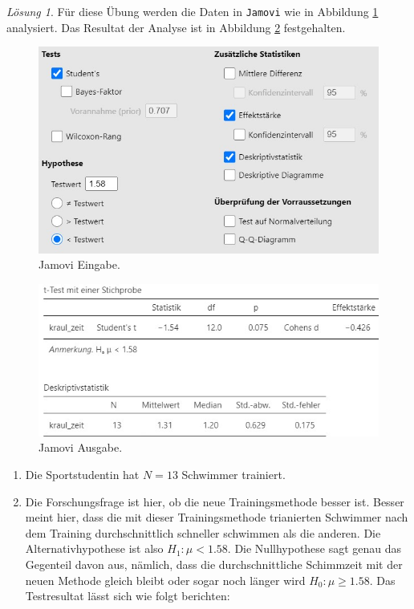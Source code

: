\documentclass[
]{book}
\providecommand{\tightlist}{%
  \setlength{\itemsep}{0pt}\setlength{\parskip}{0pt}}
\theoremstyle{definition}
\theoremstyle{definition}
\theoremstyle{definition}
\theoremstyle{definition}
\theoremstyle{remark}
\newtheorem*{solution}{Lösung}
\begin{document}
\begin{solution}
Für diese Übung werden die Daten in \texttt{Jamovi} wie in Abbildung \ref{fig:sol-schwimmen-input} analysiert. Das Resultat der Analyse ist in Abbildung \ref{fig:sol-schwimmen-output} festgehalten.

\begin{figure}
\includegraphics[width=1\linewidth]{figures/05-exr-schwimmen-jmv-input} \caption{Jamovi Eingabe.}\label{fig:sol-schwimmen-input}
\end{figure}

\begin{figure}
\includegraphics[width=1\linewidth]{figures/05-exr-schwimmen-jmv-output} \caption{Jamovi Ausgabe.}\label{fig:sol-schwimmen-output}
\end{figure}

\begin{enumerate}
\def\labelenumi{\alph{enumi})}
\tightlist
\item
  Die Sportstudentin hat \(N = 13\) Schwimmer trainiert.
\item
  Die Forschungsfrage ist hier, ob die neue Trainingsmethode besser ist. Besser meint hier, dass die mit dieser Trainingsmethode trianierten Schwimmer nach dem Training durchschnittlich schneller schwimmen als die anderen. Die Alternativhypothese ist also \(H_1: \mu < 1.58\). Die Nullhypothese sagt genau das Gegenteil davon aus, nämlich, dass die durchschnittliche Schimmzeit mit der neuen Methode gleich bleibt oder sogar noch länger wird \(H_0: \mu \geq 1.58\). Das Testresultat lässt sich wie folgt berichten:
\end{enumerate}


\end{solution}
\end{document}
